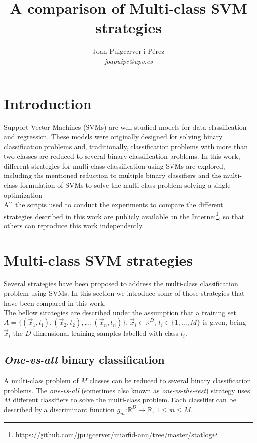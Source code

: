 \documentclass[10pt,a4paper]{article}
\author{Joan Puigcerver i Pérez\\
\emph{joapuipe@upv.es}
}
\title{A comparison of Multi-class SVM strategies}
\begin{document}
\maketitle

\section{Introduction}
Support Vector Machines (SVMs)\cite{cortes1995support} are well-studied models for data classification and regression. These models were originally designed for solving binary classification problems and, traditionally, classification problems with more than two classes are reduced to several binary classification problems. In this work, different strategies for multi-class classification using SVMs are explored, including the mentioned reduction to multiple binary classifiers and the multi-class formulation of SVMs to solve the multi-class problem solving a single optimization.\\

All the scripts used to conduct the experiments to compare the different strategies described in this work are publicly available on the Internet\footnote{\url{https://github.com/jpuigcerver/miarfid-ann/tree/master/statlog}}, so that others can reproduce this work independently.

\section{Multi-class SVM strategies}
Several strategies have been proposed to address the multi-class classification problem using SVMs. In this section we introduce some of those strategies that have been compared in this work.\\

The bellow strategies are described under the assumption that a training set $A = \{(\vec{x}_1, t_1), (\vec{x}_2, t_2), \ldots, (\vec{x}_n, t_n)\}$, $\vec{x}_i \in \mathbb{R}^D$, $t_i \in \{1, \ldots, M\}$ is given, being $\vec{x}_i$ the $D$-dimensional training samples labelled with class $t_i$.

\subsection{\emph{One-vs-all} binary classification}
A multi-class problem of $M$ classes can be reduced to several binary classification problems. The \emph{one-vs-all} (sometimes also known as \emph{one-vs-the-rest}) strategy uses $M$ different classifiers to solve the multi-class problem. Each classifier can be described by a discriminant function $g_m : \mathbb{R}^D \rightarrow \mathbb{R}$, $1 \leq m \leq M$.\\
\end{document}
